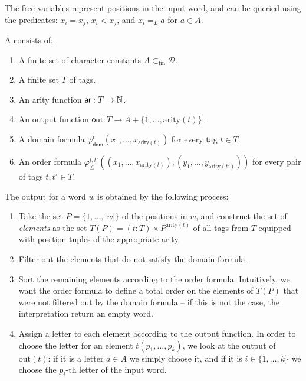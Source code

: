 The free variables represent positions in the input word, and can be queried using the predicates: 
$x_i = x_j$, $x_i < x_j$, and $x_i =_L a$ for $a \in A$.

\begin{definition}
A  consists of:
\begin{enumerate}
\item A finite set of character constants $A \subset_{\textrm{fin}}\mathcal{D}$.
\item A finite set $T$ of tags.
\item An arity function $\mathsf{ar} : T \to \mathbb{N}$.
\item An output function $\mathsf{out} : T \to A + \{1, \ldots, \text{arity}(t)\}$. 
\item A domain formula $\varphi_{\mathsf{dom}}^t(x_1,\ldots,x_{\mathsf{arity}(t)})$ 
    for every tag $t \in T$.
\item An order formula $\varphi_{\leq}^{t,t'}((x_1,\ldots,x_{\text{arity}(t)}),(y_1,\ldots,y_{\text{arity}(t')}))$ for every pair of tags $t,t' \in T$. 
\end{enumerate}
\end{definition}

The output for a word $w$ is obtained by the following process:
\begin{enumerate}
    \item  Take the set $P = \{1, \ldots, |w|\}$ of the positions in $w$, and construct the set 
           of \emph{elements} as the set $T(P) = (t : T) \times P^{\text{arity}(t)}$
           of all tags from $T$ equipped with position tuples of the appropriate arity.
    \item Filter out the elements that do not satisfy the domain formula.
    \item Sort the remaining elements according to the order formula. Intuitively, we 
          want the order formula to define a total order on the elements of $T(P)$ that 
          were not filtered out by the domain formula -- if this is not the case,
          the interpretation return an empty word.
    \item Assign a letter to each element according to the output function.
          In order to choose the letter for an element $t(p_1, \ldots, p_k)$, we look at the 
          output of $\text{out}(t)$: if it is a letter $a \in A$ we simply choose it,
          and if it is $i \in \{1, \ldots, k\}$ we choose the $p_i$-th letter of the input word.
\end{enumerate}

